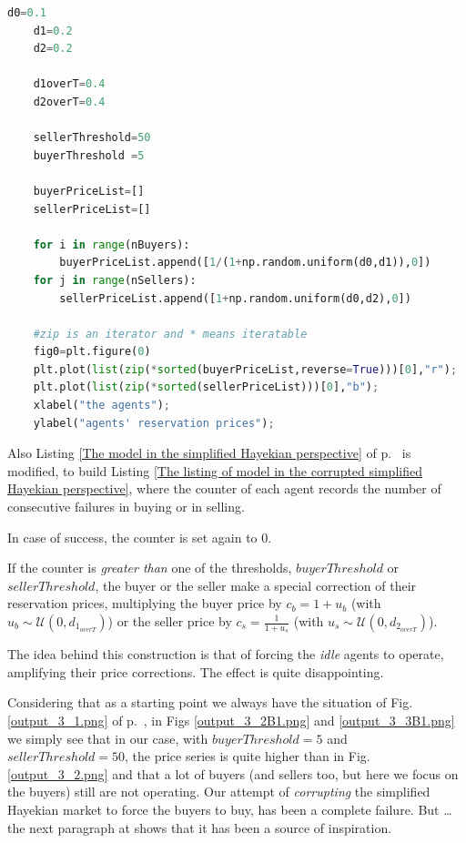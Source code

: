\documentclass[10pt]{report}
\begin{document}
\begin{appendices}
\begin{lstlisting}[language=Python, caption=Warming up for the corrupted version of the model, 
label={Warming up for the corrupted version},basicstyle=\ttfamily\footnotesize]
    d0=0.1
    d1=0.2
    d2=0.2
    
    d1overT=0.4
    d2overT=0.4

    sellerThreshold=50
    buyerThreshold =5

    buyerPriceList=[]
    sellerPriceList=[]

    for i in range(nBuyers):
        buyerPriceList.append([1/(1+np.random.uniform(d0,d1)),0])
    for j in range(nSellers):
        sellerPriceList.append([1+np.random.uniform(d0,d2),0])
    
    #zip is an iterator and * means iteratable    
    fig0=plt.figure(0)
    plt.plot(list(zip(*sorted(buyerPriceList,reverse=True)))[0],"r");
    plt.plot(list(zip(*sorted(sellerPriceList)))[0],"b");
    xlabel("the agents");
    ylabel("agents' reservation prices");
\end{lstlisting}


Also Listing \ref{The model in the simplified Hayekian perspective} of p.~\pageref{The model in the simplified Hayekian perspective} is modified, to build Listing \ref{The listing of model in the corrupted simplified Hayekian perspective}, where the counter of each agent records the number of consecutive failures in buying or in selling.

In case of success, the counter is set again to $0$.

If the counter is \emph{greater than}  one of the thresholds, $buyerThreshold$ or $sellerThreshold$, the buyer or the seller make a special correction of their reservation prices, multiplying the buyer price by $c_b=1 + u_b$ (with $u_b\sim\mathcal{U}(0,d_{1_{overT}})$) or the seller price by $c_s=\frac{1} {1 + u_s}$ (with $u_s\sim\mathcal{U}(0,d_{2_{overT}})$).

The idea behind this construction is that of forcing the \emph{idle} agents to operate, amplifying their price corrections. The effect is quite disappointing.

Considering that as a starting point we always have the situation of Fig. \ref{output_3_1.png} of p.~\pageref{output_3_1.png}, in Figs \ref{output_3_2B1.png} and \ref{output_3_3B1.png} we simply see that in our case, with $buyerThreshold=5$ and  $sellerThreshold=50$, the price series is quite higher than in Fig. \ref{output_3_2.png} and that a lot of buyers (and sellers too, but here we focus on the buyers) still are not operating. Our attempt of \emph{corrupting} the simplified Hayekian market to force the buyers to buy, has been a complete failure. But \ldots the next paragraph at \pageref{inspiration} shows that it has been a source of inspiration.





\end{appendices}
\end{document}
